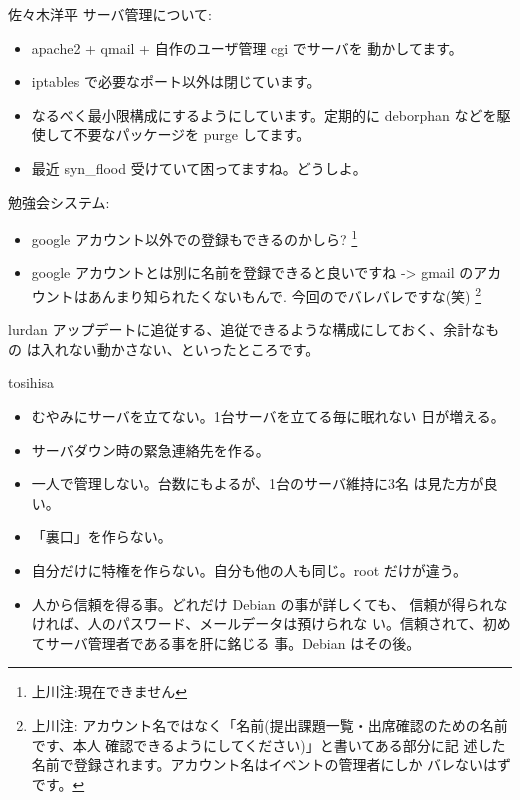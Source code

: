 \documentclass[mingoth,a4paper]{jsarticle}
\begin{document}
\begin{prework*}{ 佐々木洋平 }
    サーバ管理について:
    \begin{itemize}
          \item apache2 + qmail + 自作のユーザ管理 cgi でサーバを
        動かしてます。
          \item iptables で必要なポート以外は閉じています。
          \item なるべく最小限構成にするようにしています。定期的に
        deborphan などを駆使して不要なパッケージを purge してます。
          \item 最近 syn\_flood 受けていて困ってますね。どうしよ。
    \end{itemize}
    勉強会システム:
    \begin{itemize}
          \item google アカウント以外での登録もできるのかしら?
        \footnote{上川注:現在できません}
          \item google アカウントとは別に名前を登録できると良いですね
        -> gmail のアカウントはあんまり知られたくないもんで.
        今回のでバレバレですな(笑) 
        \footnote{上川注:
          アカウント名ではなく「名前(提出課題一覧・出席確認のための名前です、本人
          確認できるようにしてください)」と書いてある部分に記
          述した名前で登録されます。アカウント名はイベントの管理者にしか
          バレないはずです。}
    \end{itemize}
\end{prework*}

\begin{prework*}{ lurdan }
    アップデートに追従する、追従できるような構成にしておく、余計なもの
    は入れない動かさない、といったところです。
\end{prework*}

\begin{prework*}{ tosihisa }
    \begin{itemize}
          \item むやみにサーバを立てない。1台サーバを立てる毎に眠れない
        日が増える。
          \item サーバダウン時の緊急連絡先を作る。
          \item 一人で管理しない。台数にもよるが、1台のサーバ維持に3名
        は見た方が良い。
          \item 「裏口」を作らない。
          \item 自分だけに特権を作らない。自分も他の人も同じ。root だけが違う。
          \item 人から信頼を得る事。どれだけ Debian の事が詳しくても、
        信頼が得られなければ、人のパスワード、メールデータは預けられな
        い。信頼されて、初めてサーバ管理者である事を肝に銘じる
        事。Debian はその後。
    \end{itemize}
\end{prework*}
\end{document}
